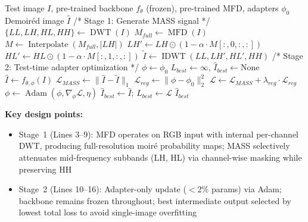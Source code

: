 \documentclass[review,10pt]{elsarticle}
\begin{document}
\begin{algorithm}[t]
\caption{MoTA --- Moir\'{e} Test-Time Adaptation}
\label{alg:mota}
\begin{algorithmic}[1]
\REQUIRE Test image $I$, pre-trained backbone $f_\theta$ (frozen), pre-trained MFD, adapters $\phi_0$
\ENSURE Demoir\'{e}d image $\hat{I}$
\STATE /* Stage 1: Generate MASS signal */
\STATE $\{LL, LH, HL, HH\} \leftarrow \operatorname{DWT}(I)$ 
\STATE $M_{full} \leftarrow \operatorname{MFD}(I)$ 
\STATE $M \leftarrow \operatorname{Interpolate}(M_{full}, |LH|)$ 
\STATE $LH' \leftarrow LH \odot (1 - \alpha \cdot M[:,0,:,:])$ 
\STATE $HL' \leftarrow HL \odot (1 - \alpha \cdot M[:,1,:,:])$ 
\STATE $\tilde{I} \leftarrow \operatorname{IDWT}(LL, LH', HL', HH)$ 
\STATE /* Stage 2: Test-time adapter optimization */
\STATE $\phi \leftarrow \phi_0$ 
\STATE $L_{best} \leftarrow \infty$, $\hat{I}_{best} \leftarrow \text{None}$ 
    \STATE $\hat{I} \leftarrow f_{\theta,\phi}(I)$ 
    \STATE $\mathcal{L}_{MASS} \leftarrow \|\hat{I} - \tilde{I}\|_1$ 
    \STATE $\mathcal{L}_{reg} \leftarrow \|\phi - \phi_0\|_2^2$ 
    \STATE $\mathcal{L} \leftarrow \mathcal{L}_{MASS} + \lambda_{reg} \cdot \mathcal{L}_{reg}$
    \STATE $\phi \leftarrow \operatorname{Adam}(\phi, \nabla_\phi \mathcal{L}, \eta)$ 
        \STATE $\hat{I}_{best} \leftarrow \hat{I}$; $L_{best} \leftarrow \mathcal{L}$ 
    \ENDIF
\ENDFOR
\STATE \RETURN $\hat{I}_{best}$
\end{algorithmic}

\vspace{0.5em}
\textbf{Key design points:}
\begin{itemize}
    \item Stage~1 (Lines 3--9): MFD operates on RGB input with internal per-channel DWT, producing full-resolution moir\'{e} probability maps; MASS selectively attenuates mid-frequency subbands (LH, HL) via channel-wise masking while preserving HH
    \item Stage~2 (Lines 10--16): Adapter-only update ($<$2\% params) via Adam; backbone remains frozen throughout; best intermediate output selected by lowest total loss to avoid single-image overfitting
\end{itemize}
\end{algorithm}
\end{document}
